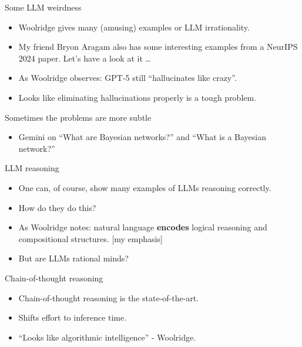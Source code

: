 \documentclass[10pt]{beamer}
\begin{document}
\begin{titledslide}{Some LLM weirdness}

  \begin{itemize}
  \item Woolridge gives many (amusing) examples or LLM irrationality.
  \item My friend Bryon Aragam also has some interesting examples from
    a NeurIPS 2024 paper. Let's have a look at it \dots
  \item As Woolridge observes: GPT-5 still ``hallucinates like
    crazy''.
  \item Looks like eliminating hallucinations properly is a tough problem.
  \end{itemize}
  
\end{titledslide}
\begin{titledslide}{Sometimes the problems are more subtle}


  \begin{itemize}
  \item Gemini on ``What are Bayesian networks?'' and ``What is a
    Bayesian network?''
  \end{itemize}
  
\end{titledslide}
\begin{titledslide}{LLM reasoning}

  \begin{itemize}
  \item One can, of course, show many examples of LLMs reasoning
    correctly.
  \item How do they do this?
  \item As Woolridge notes: natural language \textbf{encodes} logical
    reasoning and compositional structures. [my emphasis]
  \item But are LLMs rational minds?
  \end{itemize}
  
\end{titledslide}
\begin{titledslide}{Chain-of-thought reasoning}

  \begin{itemize}
  \item Chain-of-thought reasoning is the state-of-the-art.
  \item Shifts effort to inference time.
  \item ``Looks like algorithmic intelligence'' - Woolridge.
  \end{itemize}
  
\end{titledslide}
\end{document}
